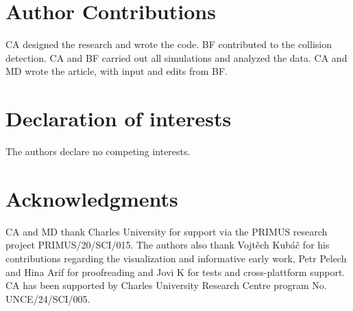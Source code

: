 \documentclass[twocolumn]{biophys-new}
\begin{document}
\section*{Author Contributions}

CA designed the research and wrote the code. BF contributed to the collision detection. CA and BF carried out all simulations and analyzed the data. CA and MD wrote the article, with input and edits from BF. 

\section*{Declaration of interests}

The authors declare no competing interests.

\section*{Acknowledgments}
CA and MD thank Charles University for support via the PRIMUS research project PRIMUS/20/SCI/015. The authors also thank Vojt\v{e}ch Kub\'{a}\v{c} for his contributions regarding the visualization and informative early work, Petr Pelech and Hina Arif for proofreading and Jovi K for tests and cross-plattform support. CA has been supported by Charles University Research Centre program No. UNCE/24/SCI/005.
\end{document}
